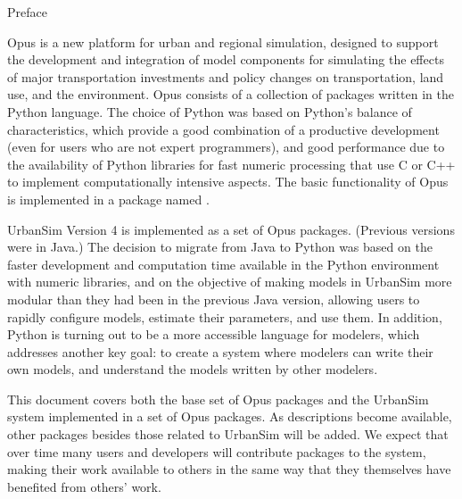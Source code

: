 
{\huge Preface}
\label{preface}

Opus is a new platform for urban and regional simulation, designed to
support the development and integration of model
components  for simulating the
effects of major transportation investments and policy changes
on transportation,  land use, 
and the environment. 
Opus consists of a collection of packages
written in the Python language. The choice of
Python was based on Python's
balance of characteristics, which provide a good combination of a
productive development (even for users who are not expert programmers), and
good performance due to the availability of Python
libraries for fast
numeric processing  that use C or C++
to implement computationally intensive
aspects.  The basic functionality of Opus is implemented in a package named .

UrbanSim Version 4  is implemented as a set of
Opus packages. (Previous versions  were in Java.) 
The decision to migrate from Java to Python 
was based on the faster development and computation time available
in the Python environment with numeric libraries, and on the objective of
making models  in UrbanSim more modular than they had been in the previous
Java version, allowing users to rapidly configure models,  estimate their
parameters, and use them. In addition, Python is turning out to be a more
accessible language for modelers, which addresses another key goal:  to
create a system where modelers can write their own models, and understand
the models written by other modelers.


This document covers both the base set of Opus packages and the UrbanSim
system implemented in a set of Opus packages.  As descriptions
become available, other packages besides those related to UrbanSim will be
added.  We expect that over time many users and developers will contribute
packages to the system, making their work available to others in the same
way that they themselves have benefited from others' work.

